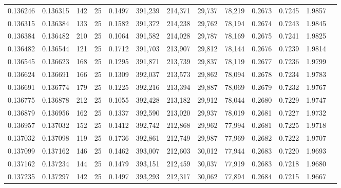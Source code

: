 \begin{tabular}{rrrrrrrrrrrrr}
0.136246 & 0.136315 &   142 &  25 &                                     0.1497 & 391,239 & 214,371 &  29,737 &  78,219 & 0.2673 & 0.7245 & 1.9857 \\
0.136315 & 0.136384 &   133 &  25 &                                     0.1582 & 391,372 & 214,238 &  29,762 &  78,194 & 0.2674 & 0.7243 & 1.9845 \\
0.136384 & 0.136482 &   210 &  25 &                                     0.1064 & 391,582 & 214,028 &  29,787 &  78,169 & 0.2675 & 0.7241 & 1.9825 \\
0.136482 & 0.136544 &   121 &  25 &                                     0.1712 & 391,703 & 213,907 &  29,812 &  78,144 & 0.2676 & 0.7239 & 1.9814 \\
0.136545 & 0.136623 &   168 &  25 &                                     0.1295 & 391,871 & 213,739 &  29,837 &  78,119 & 0.2677 & 0.7236 & 1.9799 \\
0.136624 & 0.136691 &   166 &  25 &                                     0.1309 & 392,037 & 213,573 &  29,862 &  78,094 & 0.2678 & 0.7234 & 1.9783 \\
0.136691 & 0.136774 &   179 &  25 &                                     0.1225 & 392,216 & 213,394 &  29,887 &  78,069 & 0.2679 & 0.7232 & 1.9767 \\
0.136775 & 0.136878 &   212 &  25 &                                     0.1055 & 392,428 & 213,182 &  29,912 &  78,044 & 0.2680 & 0.7229 & 1.9747 \\
0.136879 & 0.136956 &   162 &  25 &                                     0.1337 & 392,590 & 213,020 &  29,937 &  78,019 & 0.2681 & 0.7227 & 1.9732 \\
0.136957 & 0.137032 &   152 &  25 &                                     0.1412 & 392,742 & 212,868 &  29,962 &  77,994 & 0.2681 & 0.7225 & 1.9718 \\
0.137032 & 0.137098 &   119 &  25 &                                     0.1736 & 392,861 & 212,749 &  29,987 &  77,969 & 0.2682 & 0.7222 & 1.9707 \\
0.137099 & 0.137162 &   146 &  25 &                                     0.1462 & 393,007 & 212,603 &  30,012 &  77,944 & 0.2683 & 0.7220 & 1.9693 \\
0.137162 & 0.137234 &   144 &  25 &                                     0.1479 & 393,151 & 212,459 &  30,037 &  77,919 & 0.2683 & 0.7218 & 1.9680 \\
0.137235 & 0.137297 &   142 &  25 &                                     0.1497 & 393,293 & 212,317 &  30,062 &  77,894 & 0.2684 & 0.7215 & 1.9667 \\

\end{tabular}
